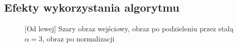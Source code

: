 \documentclass[a4paper,12pt, titlepage]{report}
\begin{document}
\subsection*{Efekty wykorzystania algorytmu}
\begin{figure}[h]
    \centering
    \caption{[Od lewej] Szary obraz wejściowy, obraz po podzieleniu przez stałą \(\alpha=3\), obraz po normalizacji}%
    \label{fig:geo_after_grey1}%
\end{figure}
\FloatBarrier
\end{document}
